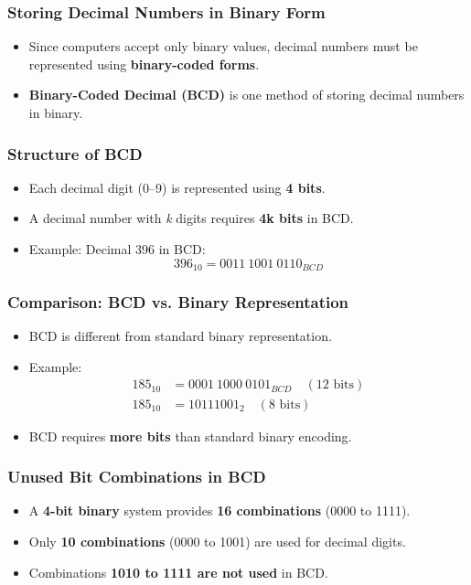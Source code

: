 \documentclass[a4paper,12pt]{article}
\begin{document}
\subsubsection{Storing Decimal Numbers in Binary Form}
\begin{itemize}
    \item Since computers accept only binary values, decimal numbers must be represented using \textbf{binary-coded forms}.
    \item \textbf{Binary-Coded Decimal (BCD)} is one method of storing decimal numbers in binary.
\end{itemize}

\subsubsection{Structure of BCD}
\begin{itemize}
    \item Each decimal digit (0--9) is represented using \textbf{4 bits}.
    \item A decimal number with \textit{k} digits requires \textbf{4k bits} in BCD.
    \item Example: Decimal 396 in BCD:
    \begin{equation*}
        396_{10} = 0011\ 1001\ 0110_{BCD}
    \end{equation*}
\end{itemize}

\subsubsection{Comparison: BCD vs. Binary Representation}
\begin{itemize}
    \item BCD is different from standard binary representation.
    \item Example:
    \begin{align*}
        185_{10} &= 0001\ 1000\ 0101_{BCD} \quad (12\text{ bits})\\
        185_{10} &= 10111001_2 \quad (8\text{ bits})
    \end{align*}
    \item BCD requires \textbf{more bits} than standard binary encoding.
\end{itemize}

\subsubsection{Unused Bit Combinations in BCD}
\begin{itemize}
    \item A \textbf{4-bit binary} system provides \textbf{16 combinations} (0000 to 1111).
    \item Only \textbf{10 combinations} (0000 to 1001) are used for decimal digits.
    \item Combinations \textbf{1010 to 1111 are not used} in BCD.
\end{itemize}
\end{document}
